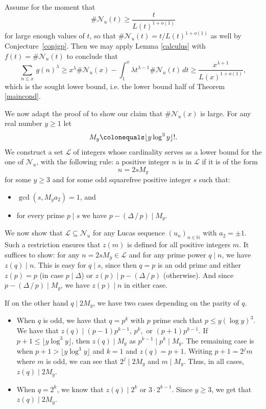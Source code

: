 \documentclass[12pt,a4paper,oneside]{amsart}
\begin{document}
Assume for the moment that \[ \#\mathcal N_{u}(t)\ge \frac{t}{L(t)^{1+o(1)}}  \] for large enough values of $t$, so that $\#\mathcal N_{u}(t)= t/L(t)^{1+o(1)} $ as well by  Conjecture~\ref{conjgp}. Then we may apply Lemma \ref{calculus} with $f(t)=\#\mathcal N_{u}(t)$ to conclude that 
\[ \sum_{n\le x}\,g(n)^{\lambda} 
\ge x^\lambda \#\mathcal{N}_u(x) - \int_1^x \lambda t^{\lambda-1} \#\mathcal{N}_u(t) \, dt
 \ge  \frac{x^{\lambda+1}}{L(x)^{1+o(1)}}, \]
which is the sought lower bound, i.e. the lower bound half of Theorem \ref{maincond}.


\bigskip

We now adapt the proof of \cite[Th. 1.3]{ALPS12} to show our claim that $\#\mathcal{N}_u(x)$ is large. For any real number $y\ge1$ let
\[
M_y\colonequals \lfloor y\log^{3} y\rfloor !.
\]
We construct a set $\mathcal{L}$ of integers whose cardinality serves as a lower bound for the one of $\mathcal{N}_u$, with the following rule: a positive integer $n$ is in $ \mathcal{L}$ if it is of the form \[n = 2sM_y\] for some $y\ge3$ and for some odd
squarefree positive integer $s$ such that: 
\begin{itemize}
\item $\gcd(s,M_ya_{2})\allowbreak=1$, and 
\item for every prime $p\mid s$ we have $p-(\Delta\, /\, p)\mid M_y$. 
\end{itemize}

We now show that $\mathcal{L}\subseteq\mathcal{N}_u$
for any Lucas sequence $(u_n)_{n \in \mathbb N}$ with $a_2=\pm 1$. Such a restriction ensures that $z(m)$ is defined for all positive integers $m$.
It suffices to show: for any
$n=2sM_y\in\mathcal{L}$ and for any prime power
$q\mid n$, we have $z(q) \mid n$.
This is easy for $q\mid s$, since then $q=p$ is an odd prime and either
$z(p)=p$ (in case $p\mid\Delta$) or
$z(p)\mid p-(\Delta\, /\, p)$ (otherwise).  And since $p-(\Delta\, /\, p)\mid M_y$, we have
$z(p)\mid n$ in either case.

If on the other hand $q \mid 2M_y$, we have two cases depending on the parity of $q$.
\begin{itemize}
    \item When $q$ is odd, we have that $q=p^{k}$ with $p$ prime such that $p\le y(\log y)^{3}$. We have that $z(q)\mid (p-1)p^{k-1}, \,p^{k},\text{ or }(p+1)p^{k-1}$. If $p+1\le \lfloor y\log^{3} y\rfloor$, then $z(q)\mid M_y$ as $p^{k-1}\mid p^{k}\mid M_y$. The remaining case is when $p+1>\lfloor y\log^3 y\rfloor $ and $k=1$ and $z(q)=p+1$. Writing $p+1=2^{j}m$ where $m$ is odd, we can see that $2^j\mid 2M_y$ and $m\mid M_y$. Thus, in all cases, $z(q)\mid 2M_y$.
    \item When $q=2^{k}$, we know that $z(q)\mid 2^{k}\text{ or }3\cdot2^{k-1}$. Since $y\ge 3$, we get that $z(q)\mid 2M_y$.
\end{itemize}
\end{document}
